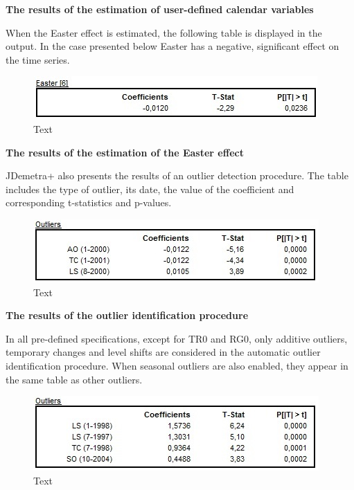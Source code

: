 \documentclass[
  letterpaper,
  DIV=11,
  numbers=noendperiod]{scrreprt}
\begin{document}
\textbf{The results of the estimation of user-defined calendar
variables}

When the Easter effect is estimated, the following table is displayed in
the output. In the case presented below Easter has a negative,
significant effect on the time series.

\begin{figure}

{\centering \includegraphics{./All_images/image33_RMSB.jpg}

}

\caption{Text}

\end{figure}

\textbf{The results of the estimation of the Easter effect}

JDemetra+ also presents the results of an outlier detection procedure.
The table includes the type of outlier, its date, the value of the
coefficient and corresponding t-statistics and p-values.

\begin{figure}

{\centering \includegraphics{./All_images/image34_RMSB.jpg}

}

\caption{Text}

\end{figure}

\textbf{The results of the outlier identification procedure}

In all pre-defined specifications, except for TR0 and RG0, only additive
outliers, temporary changes and level shifts are considered in the
automatic outlier identification procedure. When seasonal outliers are
also enabled, they appear in the same table as other outliers.

\begin{figure}

{\centering \includegraphics{./All_images/image35_RMSB.jpg}

}

\caption{Text}

\end{figure}
\end{document}
